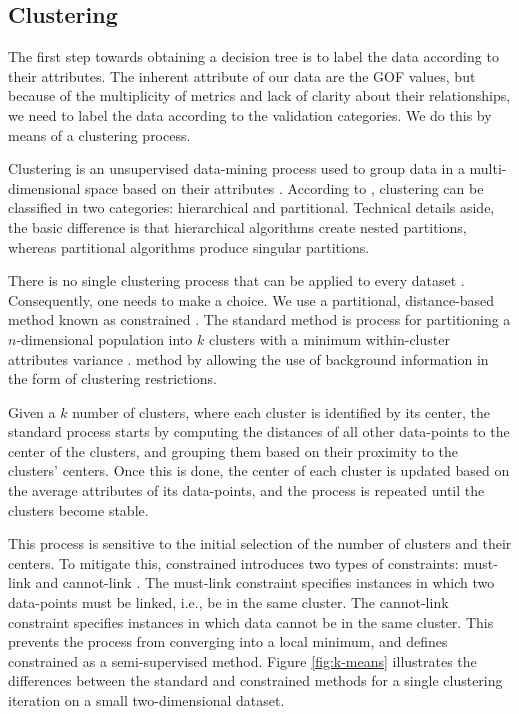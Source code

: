 
\subsection{Clustering}
\label{sec:clustering}

The first step towards obtaining a decision tree is to label the data according to their attributes. The inherent attribute of our data are the GOF values, but because of the multiplicity of metrics and lack of clarity about their relationships, we need to label the data according to the validation categories. We do this by means of a clustering process.

Clustering is an unsupervised data-mining process used to group data in a multi-dimensional space based on their attributes \citep{Fayyad_1996_IEEE}. According to \citet{Jain_1999_ACMCS}, clustering can be classified in two categories: hierarchical and partitional. Technical details aside, the basic difference is that hierarchical algorithms create nested partitions, whereas partitional algorithms produce singular partitions.

There is no single clustering process that can be applied to every dataset \citep{Dy_2004_MLR, Jain_1988_Book, Hartigan_1985_JOC}. Consequently, one needs to make a choice. We use a partitional, distance-based method known as constrained \kmeans{}. The standard \kmeans{} method is  process for partitioning a $n$-dimensional population into $k$ clusters with a minimum within-cluster attributes variance \citep[e.g.,][]{Macqueen_1967_Proc}.  method by allowing the use of background information in the form of clustering restrictions.

Given a $k$ number of clusters, where each cluster is identified by its center, the standard process starts by computing the distances of all other data-points to the center of the clusters, and grouping them based on their proximity to the clusters' centers. Once this is done, the center of each cluster is updated based on the average attributes of its data-points, and the process is repeated until the clusters become stable.

This process is sensitive to the initial selection of the number of clusters and their centers. To mitigate this, constrained \kmeans{} introduces two types of constraints: must-link and cannot-link \citep{Wagstaff_2001_Proc}. The must-link constraint specifies instances in which two data-points must be linked, i.e., be in the same cluster. The cannot-link constraint specifies instances in which data cannot be in the same cluster. This prevents the process from converging into a local minimum, and defines constrained \kmeans{} as a semi-supervised method. Figure \ref{fig:k-means} illustrates the differences between the standard and constrained \kmeans{} methods for a single clustering iteration on a small two-dimensional dataset.

